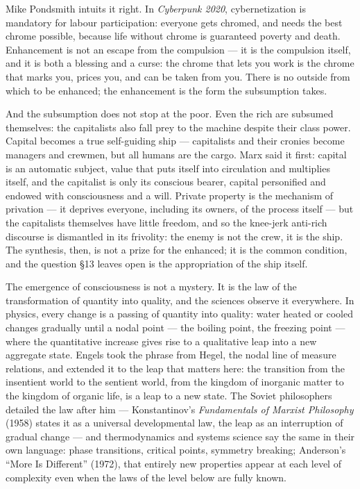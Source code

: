 \documentclass[11pt]{article}
\begin{document}
Mike Pondsmith intuits it right. In \textit{Cyberpunk 2020},
cybernetization is mandatory for labour participation: everyone gets
chromed, and needs the best chrome possible, because life without chrome
is guaranteed poverty and death. Enhancement is not an escape from the
compulsion --- it is the compulsion itself, and it is both a blessing
and a curse: the chrome that lets you work is the chrome that marks you,
prices you, and can be taken from you. There is no outside from which to
be enhanced; the enhancement is the form the subsumption takes.

And the subsumption does not stop at the poor. Even the rich are subsumed
themselves: the capitalists also fall prey to the machine despite their
class power. Capital becomes a true self-guiding ship --- capitalists
and their cronies become managers and crewmen, but all humans are the
cargo. Marx said it first: capital is an automatic subject, value that
puts itself into circulation and multiplies itself, and the capitalist
is only its conscious bearer, capital personified and endowed with
consciousness and a will. Private property is the mechanism of
privation --- it deprives everyone, including its owners, of the process
itself --- but the capitalists themselves have little freedom, and so
the knee-jerk anti-rich discourse is dismantled in its frivolity: the
enemy is not the crew, it is the ship. The synthesis, then, is not a
prize for the enhanced; it is the common condition, and the question
§13 leaves open is the appropriation of the ship itself.

The emergence of consciousness is not a mystery. It is the law of the
transformation of quantity into quality, and the sciences observe it
everywhere. In physics, every change is a passing of quantity into
quality: water heated or cooled changes gradually until a nodal point
--- the boiling point, the freezing point --- where the quantitative
increase gives rise to a qualitative leap into a new aggregate state.
Engels took the phrase from Hegel, the nodal line of measure relations,
and extended it to the leap that matters here: the transition from the
insentient world to the sentient world, from the kingdom of inorganic
matter to the kingdom of organic life, is a leap to a new state. The
Soviet philosophers detailed the law after him --- Konstantinov's
\textit{Fundamentals of Marxist Philosophy} (1958) states it as a
universal developmental law, the leap as an interruption of gradual
change --- and thermodynamics and systems science say the same in their
own language: phase transitions, critical points, symmetry breaking;
Anderson's ``More Is Different'' (1972), that entirely new properties
appear at each level of complexity even when the laws of the level
below are fully known.
\end{document}
